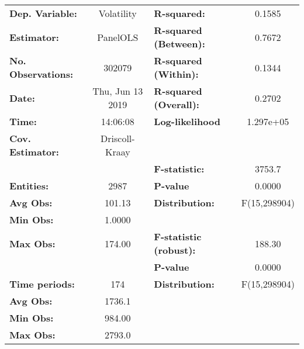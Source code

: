 \begin{center}
\begin{tabular}{lclc}
\toprule
\textbf{Dep. Variable:}                 &     Volatility     & \textbf{  R-squared:         }   &      0.1585      \\
\textbf{Estimator:}                     &      PanelOLS      & \textbf{  R-squared (Between):}  &      0.7672      \\
\textbf{No. Observations:}              &       302079       & \textbf{  R-squared (Within):}   &      0.1344      \\
\textbf{Date:}                          &  Thu, Jun 13 2019  & \textbf{  R-squared (Overall):}  &      0.2702      \\
\textbf{Time:}                          &      14:06:08      & \textbf{  Log-likelihood     }   &    1.297e+05     \\
\textbf{Cov. Estimator:}                &   Driscoll-Kraay   & \textbf{                     }   &                  \\
\textbf{}                               &                    & \textbf{  F-statistic:       }   &      3753.7      \\
\textbf{Entities:}                      &        2987        & \textbf{  P-value            }   &      0.0000      \\
\textbf{Avg Obs:}                       &       101.13       & \textbf{  Distribution:      }   &   F(15,298904)   \\
\textbf{Min Obs:}                       &       1.0000       & \textbf{                     }   &                  \\
\textbf{Max Obs:}                       &       174.00       & \textbf{  F-statistic (robust):} &      188.30      \\
\textbf{}                               &                    & \textbf{  P-value            }   &      0.0000      \\
\textbf{Time periods:}                  &        174         & \textbf{  Distribution:      }   &   F(15,298904)   \\
\textbf{Avg Obs:}                       &       1736.1       & \textbf{                     }   &                  \\
\textbf{Min Obs:}                       &       984.00       & \textbf{                     }   &                  \\
\textbf{Max Obs:}                       &       2793.0       & \textbf{                     }   &                  \\

\end{tabular}
\end{center}

